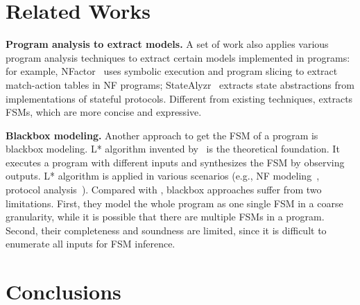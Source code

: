 \section{Related Works}
\label{sec:related}

\noindent\textbf{Program analysis to extract models.} 
A set of work also applies various program analysis techniques 
to extract certain models implemented in programs: 
for example, NFactor~\cite{wu2016automatic} 
uses symbolic execution and program slicing to extract match-action 
tables in NF programs; 
StateAlyzr~\cite{khalid2016paving} extracts state abstractions 
from implementations of stateful protocols. 
Different from existing techniques, \Tool{} extracts FSMs, 
which are more concise and expressive.

\noindent\textbf{Blackbox modeling.} 
Another approach to get the FSM of a program is blackbox modeling. 
L* algorithm invented by~\citet{angluin1987learning} 
is the theoretical foundation.
It executes a program with different inputs and 
synthesizes the FSM by observing outputs.  
L* algorithm is applied in various scenarios 
(e.g., NF modeling~\cite{moon2019alembic}, 
protocol analysis~\cite{cho2011mace}). 
Compared with \Tool{}, blackbox approaches suffer from two limitations. 
First, they model the whole program as one single FSM in a coarse granularity, 
while it is possible that there are multiple FSMs in a program. 
Second, their completeness and soundness are limited, 
since it is difficult to enumerate all inputs for 
FSM inference.



\section{Conclusions}